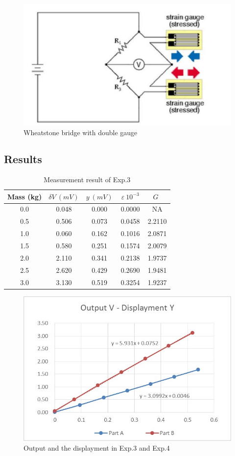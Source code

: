 \documentclass[11pt,a4paper,twoside]{article}
\begin{document}
\begin{figure}[!h]
	\centering
	\includegraphics[width=0.5\linewidth]{4}
	\caption{Wheatstone bridge with double gauge}
	\label{f4}
\end{figure}

\subsection{Results}

\begin{table}[!h]
	\centering
	\begin{tabular}{|c|c|c|c|c|}
		\hline
		Mass (kg) & $\delta V \ (mV)$ & $y\ (mV)$ & $\ \varepsilon \ 10^{-3} \ $ & $ G \ \ $  \\
		\hline\hline
		0.0 & 0.048 & 0.000 &0.0000 & NA\\
		\hline
		0.5 & 0.506 & 0.073 &0.0458 &2.2110\\
		\hline
		1.0 & 0.060 & 0.162 &0.1016 &2.0871\\
		\hline
		1.5 & 0.580 & 0.251 &0.1574 &2.0079\\
		\hline
		2.0 & 2.110 & 0.341 &0.2138 &1.9737\\
		\hline
		2.5 & 2.620 & 0.429 &0.2690 &1.9481\\
		\hline
		3.0 & 3.130 & 0.519 &0.3254 &1.9237\\
		\hline
		
	\end{tabular}
	\caption{Measurement result of Exp.3}
	\label{t3}
\end{table}
\pagebreak

\begin{figure}[!h]
	\centering
	\includegraphics[width=0.7\linewidth]{5}
	\caption{Output and the displayment in Exp.3 and Exp.4}
	\label{f5}
\end{figure}
\end{document}

